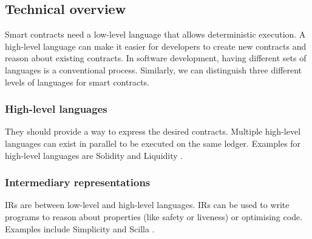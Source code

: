 

\subsection{Technical overview}
Smart contracts need a low-level language that allows deterministic execution. 
A high-level language can make it easier for developers to create new contracts and reason about existing contracts.
In software development, having different sets of languages is a conventional process.
Similarly, we can distinguish three different levels of languages for smart contracts.

\subsubsection{High-level languages} They should provide a way to express the desired contracts. Multiple high-level languages can exist in parallel to be executed on the same ledger. Examples for high-level languages are Solidity \cite{Ethereum2018Solidity} and Liquidity \cite{OCamlProSAS2018}.

\subsubsection{Intermediary representations} IRs are between low-level and high-level languages. IRs can be used to write programs to reason about properties (like safety or liveness) or optimising code. Examples include Simplicity \cite{OConnor2017} and Scilla \cite{Sergey2018}.

